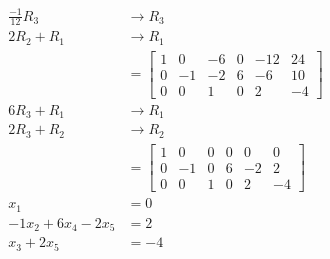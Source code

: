\documentclass{math}
\begin{document}
\begin{multicols}{2}
\begin{align*}
    \frac{-1}{12}R_3 &\to R_3 \\
    2R_2+R_1 &\to R_1 \\
    &= \begin{bmatrix}
      1 & 0 & -6 & 0 & -12 & 24 \\
      0 & -1 & -2 & 6 & -6 & 10 \\
      0 & 0 & 1 & 0 & 2 & -4
    \end{bmatrix} \\
    6R_3+R_1 &\to R_1 \\
    2R_3+R_2 &\to R_2 \\
    &= \begin{bmatrix}
      1 & 0 & 0 & 0 & 0 & 0 \\
      0 & -1 & 0 & 6 & -2 & 2 \\
      0 & 0 & 1 & 0 & 2 & -4
    \end{bmatrix} \\
    x_1 &= 0 \\
    -1x_2+6x_4-2x_5 &= 2 \\
    x_3+2x_5 &= -4
  \end{align*}
\end{multicols}
\endgroup
\end{document}
